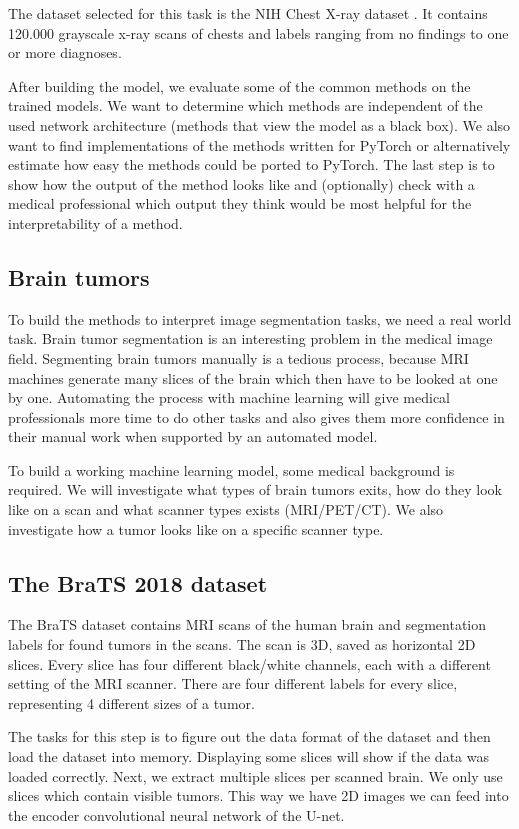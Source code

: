 The dataset selected for this task is the NIH Chest X-ray dataset \cite{wang2017chestx}. It contains 120.000 grayscale x-ray scans of chests and labels ranging from no findings to one or more diagnoses.

After building the model, we evaluate some of the common methods on the trained models. We want to determine which methods are independent of the used network architecture (methods that view the model as a black box). We also want to find implementations of the methods written for PyTorch or alternatively estimate how easy the methods could be ported to PyTorch. The last step is to show how the output of the method looks like and (optionally) check with a medical professional which output they think would be most helpful for the interpretability of a method.

\subsection{Brain tumors}
To build the methods to interpret image segmentation tasks, we need a real world task. Brain tumor segmentation is an interesting problem in the medical image field. Segmenting brain tumors manually is a tedious process, because MRI machines generate many slices of the brain which then have to be looked at one by one. Automating the process with machine learning will give medical professionals more time to do other tasks and also gives them more confidence in their manual work when supported by an automated model.

To build a working machine learning model, some medical background is required. We will investigate what types of brain tumors exits, how do they look like on a scan and what scanner types exists (MRI/PET/CT). We also investigate how a tumor looks like on a specific scanner type.

\subsection{The BraTS 2018 dataset}
The BraTS\cite{menze2015multimodal} dataset contains MRI scans of the human brain and segmentation labels for found tumors in the scans.
The scan is 3D, saved as horizontal 2D slices. Every slice has four different black/white channels, each with a different setting of the MRI scanner.
There are four different labels for every slice, representing 4 different sizes of a tumor.

The tasks for this step is to figure out the data format of the dataset and then load the dataset into memory. Displaying some slices will show if the data was loaded correctly. Next, we extract multiple slices per scanned brain. We only use slices which contain visible tumors. This way we have 2D images we can feed into the encoder convolutional neural network of the U-net.

